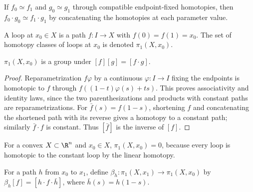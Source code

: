 If $f_0\simeq f_1$ and $g_0\simeq g_1$ through compatible endpoint-fixed
homotopies, then $f_0\cdot g_0\simeq f_1\cdot g_1$ by concatenating the
homotopies at each parameter value.

\begin{definition}
\label{def:loop-and-pi1-set}



A loop at $x_0\in X$ is a path $f:I\to X$ with $f(0)=f(1)=x_0$. The set of
homotopy classes of loops at $x_0$ is denoted $\pi_1(X,x_0)$.
\end{definition}

\begin{proposition}[$\pi_1(X,x_0)$ is a group]
\label{prop:pi1-is-a-group}



$\pi_1(X,x_0)$ is a group under $[f][g]=[f\cdot g]$.
\end{proposition}

\begin{proof}
\sketch Reparametrization $f\varphi$ by a continuous $\varphi:I\to I$ fixing
the endpoints is homotopic to $f$ through
$f((1-t)\varphi(s)+ts)$. This proves associativity and identity laws, since
the two parenthesizations and products with constant paths are
reparametrizations. For $\bar f(s)=f(1-s)$, shortening $f$ and concatenating
the shortened path with its reverse gives a homotopy to a constant path;
similarly $\bar f\cdot f$ is constant. Thus $[\bar f]$ is the inverse of
$[f]$.
\end{proof}

\begin{example}
\label{ex:convex-set-trivial-pi1}



For a convex $X\subset\R^n$ and $x_0\in X$, $\pi_1(X,x_0)=0$, because every
loop is homotopic to the constant loop by the linear homotopy.
\end{example}

\begin{definition}
\label{def:change-of-basepoint-map}



For a path $h$ from $x_0$ to $x_1$, define
$\beta_h:\pi_1(X,x_1)\to\pi_1(X,x_0)$ by
$\beta_h[f]=[h\cdot f\cdot\bar h]$, where $\bar h(s)=h(1-s)$.
\end{definition}

